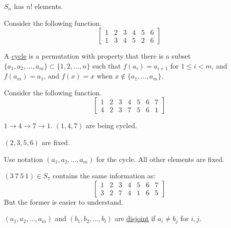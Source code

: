\documentclass[class=scrartcl, crop=false]{standalone}
\begin{document}
\begin{note}
  $S_n$ has $n!$ elements.
\end{note}
\begin{example}
  Consider the following function.
  \[
    \begin{bmatrix}
      1 & 2 & 3 & 4 & 5 & 6 \\
      1 & 3 & 4 & 5 & 2 & 6
    \end{bmatrix}
  \]
\end{example}

\begin{definition}
  A \ul{cycle} is a permutation with property that there is a subset $\{a_1, a_2, \dots, a_m\} \subset \{1, 2, \dots, n\}$ such that $f(a_i) = a_{i + 1}$ for $1 \leq i < m$, and $f(a_m) = a_1$, and $f(x) = x$ when $x \notin \{a_1, \dots, a_m\}$.
\end{definition}

\begin{example}
  Consider the following function.
  \[
    \begin{bmatrix}
      1 & 2 & 3 & 4 & 5 & 6 & 7 \\
      4 & 2 & 3 & 7 & 5 & 6 & 1
    \end{bmatrix}
  \]
  
  $1 \to 4 \to 7 \to 1$. \quad $(1, 4, 7)$ are being cycled.

  $(2, 3, 5, 6)$ are fixed.
\end{example}

\begin{note}
  Use notation $(a_1, a_2, \dots, a_m)$ for the cycle. All other elements are fixed.
\end{note}

\begin{example}
  $(3 \ 7 \ 5 \ 1) \in S_7$ contains the same information as:
  \[
    \begin{bmatrix}
      1 & 2 & 3 & 4 & 5 & 6 & 7 \\
      3 & 2 & 7 & 4 & 1 & 6 & 5
    \end{bmatrix}
  \]
  But the former is easier to understand.
\end{example}

\begin{note}
  $(a_1, a_2, \dots, a_m)$ and $(b_1, b_2, \dots, b_l)$ are \ul{disjoint} if $a_i \neq b_j$ for $i, j$.
\end{note}
\end{document}
